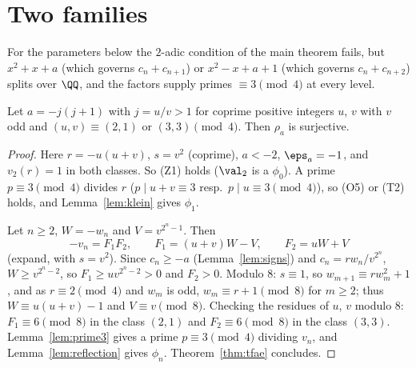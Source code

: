 \chapter{Two families}
\label{chap:families}

For the parameters below the $2$-adic condition of the main theorem fails, but $x^2 + x + a$
(which governs $c_n + c_{n+1}$) or $x^2 - x + a + 1$ (which governs $c_n + c_{n+2}$) splits over
$\QQ$, and the factors supply primes $\equiv 3 \pmod 4$ at every level.

\begin{theorem}
  \label{thm:famA}
  \leanok
  Let $a = -j(j + 1)$ with $j = u/v > 1$ for coprime positive integers $u$, $v$ with $v$ odd and
  $(u, v) \equiv (2, 1)$ or $(3, 3) \pmod 4$. Then $\rho_a$ is surjective.
\end{theorem}
\begin{proof}
  \leanok
  Here $r = -u(u + v)$, $s = v^2$ (coprime), $a < -2$, $\eps_a = -1$, and $v_2(r) = 1$ in both
  classes. So (Z1) holds ($\val_2$ is a $\phi_0$). A prime $p \equiv 3 \pmod 4$ divides $r$
  ($p \mid u + v \equiv 3$ resp.\ $p \mid u \equiv 3 \pmod 4$), so (O5) or (T2) holds, and
  Lemma~\ref{lem:klein} gives $\phi_1$.

  Let $n \ge 2$, $W = -w_n$ and $V = v^{2^n - 1}$. Then
  \[ -v_n = F_1 F_2, \qquad F_1 = (u + v) W - V, \qquad F_2 = u W + V \]
  (expand, with $s = v^2$). Since $c_n \ge -a$ (Lemma~\ref{lem:signs}) and
  $c_n = r w_n / v^{2^n}$, $W \ge v^{2^n - 2}$, so $F_1 \ge u v^{2^n - 2} > 0$ and $F_2 > 0$.
  Modulo $8$: $s \equiv 1$, so $w_{m+1} \equiv r w_m^2 + 1$, and as $r \equiv 2 \pmod 4$ and $w_m$ is
  odd, $w_m \equiv r + 1 \pmod 8$ for $m \ge 2$; thus $W \equiv u(u + v) - 1$ and $V \equiv v
  \pmod 8$. Checking the residues of $u$, $v$ modulo $8$: $F_1 \equiv 6 \pmod 8$ in the class
  $(2, 1)$ and $F_2 \equiv 6 \pmod 8$ in the class $(3, 3)$. Lemma~\ref{lem:prime3} gives a prime
  $p \equiv 3 \pmod 4$ dividing $v_n$, and Lemma~\ref{lem:reflection} gives $\phi_n$.
  Theorem~\ref{thm:tfae} concludes.
\end{proof}

